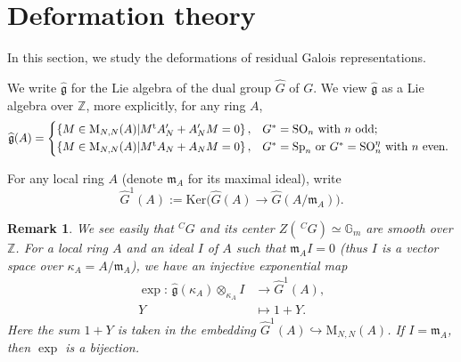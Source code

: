 \documentclass[12pt,oneside,reqno]{amsart}
\newcommand{\Z}{\mathbb{Z}}
\theoremstyle{plain}
\newtheorem{remark}[theorem]{Remark}
\begin{document}
	
	
	
	
	
	
	
	
	
	
	
	
	
	
	
	
	
	
	
	
	
	
	
	
	
	
	
	
	
	
	
	
	
	
	
	
	
	
	
	
	
	\section{Deformation theory}\label{deformation theory}
	In this section, we study the deformations of residual Galois representations.
	
	We write $\widehat{\mathfrak{g}}$ for the Lie algebra of the dual group $\widehat{G}$ of $G$. We view $\widehat{\mathfrak{g}}$ as a Lie algebra over $\Z$, more explicitly, for any ring $A$,
	\[
	\widehat{\mathfrak{g}}(A)
	=
	\begin{cases*}
		\left\{
		M\in\mathrm{M}_{N,N}(A)|M^\mathrm{t}A_N'+A_N'M=0
		\right\},
		&
		$G^\ast=\mathrm{SO}_n$ with $n$ odd;
		\\
		\left\{
		M\in\mathrm{M}_{N,N}(A)|M^\mathrm{t}A_N+A_NM=0
		\right\},
		&
		$G^\ast=\mathrm{Sp}_n$ or $G^\ast=\mathrm{SO}_n^\eta$ with $n$ even.
	\end{cases*}
	\]
	
	
	For any local ring $A$ (denote $\mathfrak{m}_A$ for its maximal ideal),	write
	\[
	\widehat{G}^1(A)
	:=
	\mathrm{Ker}
	\big(
	\widehat{G}(A)
	\rightarrow
	\widehat{G}(A/\mathfrak{m}_A)
	\big).
	\]
	
	
	
	\begin{remark}\label{dual group is smooth}\rm
		We see easily that $^CG$ and its center $Z(\,^CG)\simeq\mathbb{G}_m$
		are smooth over $\mathbb{Z}$. For a local ring $A$ and an ideal $I$ of $A$ such that $\mathfrak{m}_AI=0$ (thus $I$ is a vector space over
		$\kappa_A=A/\mathfrak{m}_A$), we have an injective exponential map
		\begin{align*}
			\exp\colon
			\,
			\widehat{\mathfrak{g}}(\kappa_A)\otimes_{\kappa_A}I
			&
			\rightarrow
			\widehat{G}^1(A),
			\\
			Y
			&
			\mapsto
			1+Y.
		\end{align*}
		Here the sum
		$1+Y$ is taken in the embedding
		$\widehat{G}^1(A)
		\hookrightarrow
		\mathrm{M}_{N,N}(A)$.
		If $I=\mathfrak{m}_A$,
		then
		$\exp$ is a bijection.
		
	\end{remark}
	
\end{document}
